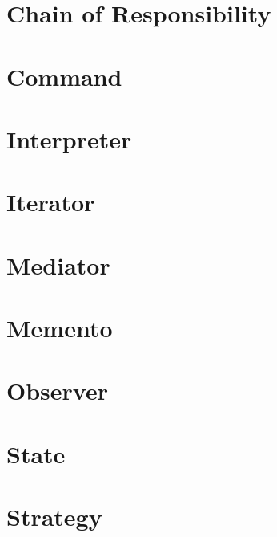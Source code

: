 \documentclass[
	12pt,				%
	openright,			%
	twoside,			%
	a4paper,			%
	english,			%
	french,				%
	spanish,			%
	brazil				%
	]{abntex2}
\begin{document}
%
%
%
%
%
%
%
%
%
%
%

\section{Chain of Responsibility}
\section{Command}
\section{Interpreter}
\section{Iterator}
\section{Mediator}
\section{Memento}
\section{Observer}
\section{State}
\section{Strategy}
\end{document}
